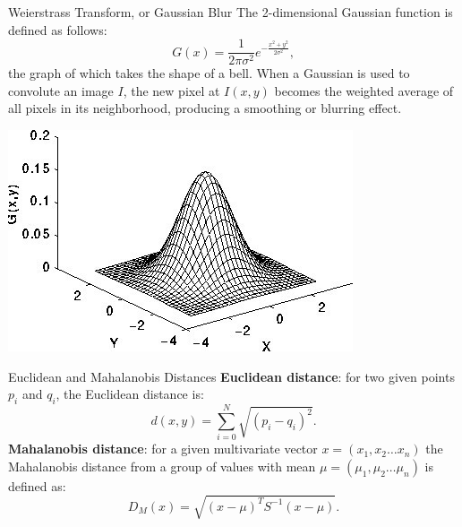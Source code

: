 \documentclass[xcolor=dvipsnames]{beamer}
\begin{document}
\begin{frame}[label=math-gaussian]{Weierstrass Transform, or Gaussian Blur}
 The 2-dimensional Gaussian function is defined as follows:
 \begin{equation}
  G(x) = \frac{1}{2 \pi \sigma^2} e^{-\frac{x^2+y^2}{2\sigma^2}},
 \end{equation}
 the graph of which takes the shape of a bell. When a Gaussian is used to convolute an image $I$, the new pixel at $I(x,y)$ becomes the weighted average of all pixels in its neighborhood, producing a smoothing or blurring effect.
\end{frame}

\begin{frame}
\begin{center}
\includegraphics[width=\textwidth]{imgs/gauss.jpg}
\end{center}
\end{frame}

\begin{frame}[label=math-distance]{Euclidean and Mahalanobis Distances}
 \textbf{Euclidean distance}: for two given points $p_i$ and $q_i$, the Euclidean distance is:
  \begin{equation} \label{eq:euclidean}
   d(x,y) = \sum_{i=0}^{N} \sqrt{(p_i-q_i)^2}.
  \end{equation}
 \textbf{Mahalanobis distance}: for a given multivariate vector $x = (x_1, x_2 \ldots x_n)$ the Mahalanobis distance from a group of values with mean $\mu = (\mu_1, \mu_2 \ldots \mu_n)$ is defined as:
  \begin{equation} \label{eq:mahalanobis}
   D_M(x) = \sqrt{(x-\mu)^TS^{-1}(x-\mu)}.
  \end{equation}
\end{frame}
\end{document}
